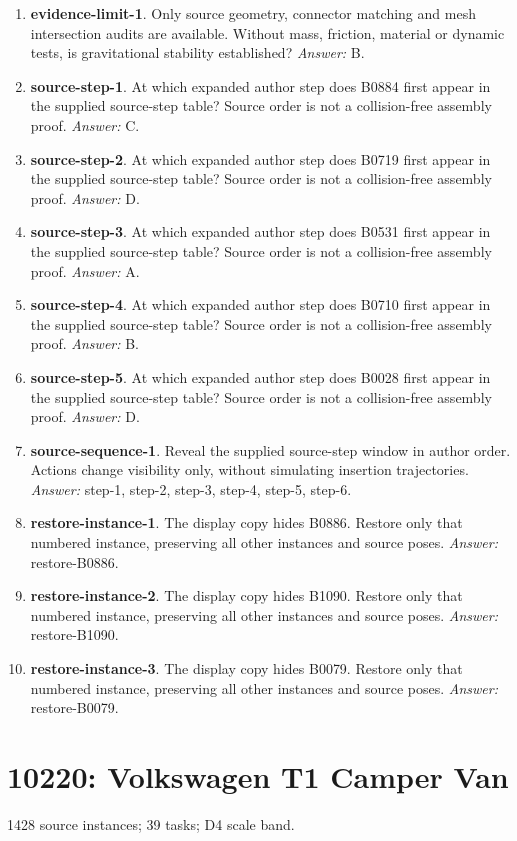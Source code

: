 \begin{enumerate}
\item \textbf{evidence-limit-1}. Only source geometry, connector matching and mesh intersection audits are available. Without mass, friction, material or dynamic tests, is gravitational stability established? \textit{Answer:} B.
\item \textbf{source-step-1}. At which expanded author step does B0884 first appear in the supplied source-step table? Source order is not a collision-free assembly proof. \textit{Answer:} C.
\item \textbf{source-step-2}. At which expanded author step does B0719 first appear in the supplied source-step table? Source order is not a collision-free assembly proof. \textit{Answer:} D.
\item \textbf{source-step-3}. At which expanded author step does B0531 first appear in the supplied source-step table? Source order is not a collision-free assembly proof. \textit{Answer:} A.
\item \textbf{source-step-4}. At which expanded author step does B0710 first appear in the supplied source-step table? Source order is not a collision-free assembly proof. \textit{Answer:} B.
\item \textbf{source-step-5}. At which expanded author step does B0028 first appear in the supplied source-step table? Source order is not a collision-free assembly proof. \textit{Answer:} D.
\item \textbf{source-sequence-1}. Reveal the supplied source-step window in author order. Actions change visibility only, without simulating insertion trajectories. \textit{Answer:} step-1, step-2, step-3, step-4, step-5, step-6.
\item \textbf{restore-instance-1}. The display copy hides B0886. Restore only that numbered instance, preserving all other instances and source poses. \textit{Answer:} restore-B0886.
\item \textbf{restore-instance-2}. The display copy hides B1090. Restore only that numbered instance, preserving all other instances and source poses. \textit{Answer:} restore-B1090.
\item \textbf{restore-instance-3}. The display copy hides B0079. Restore only that numbered instance, preserving all other instances and source poses. \textit{Answer:} restore-B0079.
\end{enumerate}
\clearpage
\section{10220: Volkswagen T1 Camper Van}
1428 source instances; 39 tasks; D4 scale band.

